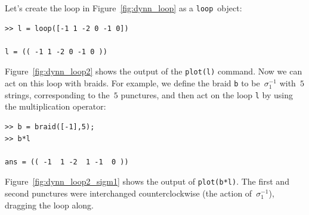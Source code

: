 \documentclass[12pt]{article}
\newcommand{\loopc}{\texttt{loop}}%
\begin{document}
Let's create the loop in Figure~\ref{fig:dynn_loop} as a \loopc\ object:
\begin{lstlisting}[frame=single,framerule=0pt]
>> l = loop([-1 1 -2 0 -1 0])

l = (( -1 1 -2 0 -1 0 ))
\end{lstlisting}
Figure~\ref{fig:dynn_loop2} shows the output of the
\lstinline{plot(l)} command.  Now we can act on this loop with braids.
For example, we define the braid \lstinline{b} to be~$\sigma_1^{-1}$
with~$5$ strings, corresponding to the~$5$ punctures, and then act on
the loop \lstinline{l} by using the multiplication operator:
%
\begin{figure}
\begin{center}
\hspace{1em}
\end{center}
\caption{}
\end{figure}
%
\begin{lstlisting}[frame=single,framerule=0pt]
>> b = braid([-1],5);
>> b*l

ans = (( -1  1 -2  1 -1  0 ))
\end{lstlisting}
Figure~\ref{fig:dynn_loop2_sigm1} shows the output of
\lstinline{plot(b*l)}.  The first and second punctures were
interchanged counterclockwise (the action of~$\sigma_1^{-1}$),
dragging the loop along.






% 
\end{document}
